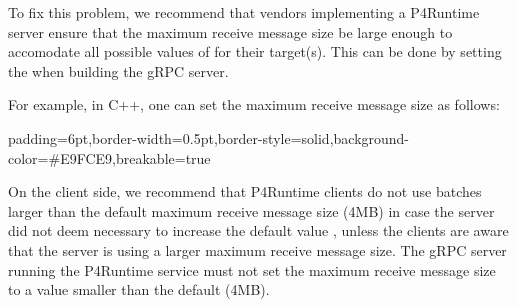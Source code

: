 \documentclass[11pt]{article}
\begin{document}
{%
To fix this problem, we recommend that vendors implementing a P4Runtime server
ensure that the maximum receive message size be large enough to accomodate all
possible values of  for their target(s). This can be done by
setting the  when building the gRPC server.%

For example, in C++, one can set the maximum receive message size as follows:%

\begin{mdbmargintb}{6pt}{6pt}%
\begin{mdblock}{padding=6pt,border-width=0.5pt,border-style=solid,background-color=\#E9FCE9,breakable=true}%
\begin{mdpre}%
\end{mdpre}%
\end{mdblock}%
\end{mdbmargintb}%

\noindent{}On the client side, we recommend that P4Runtime clients do not use 
batches larger than the default maximum receive message size (4MB) \textemdash{} in case
the server did not deem necessary to increase the default value \textemdash{}, unless the
clients are aware that the server is using a larger maximum receive message
size. The gRPC server running the P4Runtime service must not set the maximum
receive message size to a value smaller than the default (4MB).%

}
\end{document}
